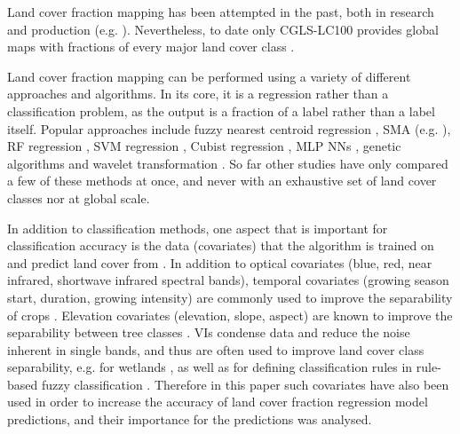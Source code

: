 \documentclass[review,authoryear,3p]{elsarticle}
\begin{document}
Land cover fraction mapping has been attempted in the past, both in research \citep{adams_classification_1995, foody1996fuzzyevaluation, colditz_land_2011, sharma_assessing_2011, uma_shankar_wavelet-fuzzy_2011, dwivedi_optimisation_2012, lizarazo_quantitative_2012, gessner_estimating_2013, okujeni_generalizing_2018} and production (e.g. \citealp{hansen2000hardtree, hansen_continuous_2011, pengra_global_2015, hansen_global_2003, sexton_global_2013}).
Nevertheless, to date only \ac{CGLS-LC100} \citep{marcel_buchhorn_copernicus_2019} provides global maps with fractions of every major land cover class \citep{nandin-erdene_tsendbazar_copernicus_2019}.

Land cover fraction mapping can be performed using a variety of different approaches and algorithms.
In its core, it is a regression rather than a classification problem, as the output is a fraction of a label rather than a label itself.
Popular approaches include fuzzy nearest centroid regression \citep{zhang2001fullyfuzzy}, \ac{SMA} (e.g. \citealp{shimabukuro1991least, adams_classification_1995, hobbs2003linear, yang_landsat_2012}), \ac{RF} regression \citep{walton2008subpixelrf}, \gls{SVM} regression \citep{walton2008subpixelrf}, Cubist regression \citep{walton2008subpixelrf}, \gls{MLP} \glspl{NN} \citep{zhang2001fullyfuzzy}, genetic algorithms \citep{stavrakoudis_boosted_2011} and wavelet transformation \citep{uma_shankar_wavelet-fuzzy_2011}.
So far other studies have only compared a few of these methods at once, and never with an exhaustive set of land cover classes nor at global scale.

In addition to classification methods, one aspect that is important for classification accuracy is the data (covariates) that the algorithm is trained on and predict land cover from \citep{yu2014metadiscoveries}. In addition to optical covariates (blue, red, near infrared, shortwave infrared spectral bands), temporal covariates (growing season start, duration, growing intensity) are commonly used to improve the separability of crops \citep{jakubauskas2001harmonic}. Elevation covariates (elevation, slope, aspect) are known to improve the separability between tree classes \citep{burrough2001fuzzy}. \Glspl{VI} condense data and reduce the noise inherent in single bands, and thus are often used to improve land cover class separability, e.g. for wetlands \citep{sader1995wetlands}, as well as for defining classification rules in rule-based fuzzy classification \citep{baraldi2006rulebased}. Therefore in this paper such covariates have also been used in order to increase the accuracy of land cover fraction regression model predictions, and their importance for the predictions was analysed.
\end{document}
